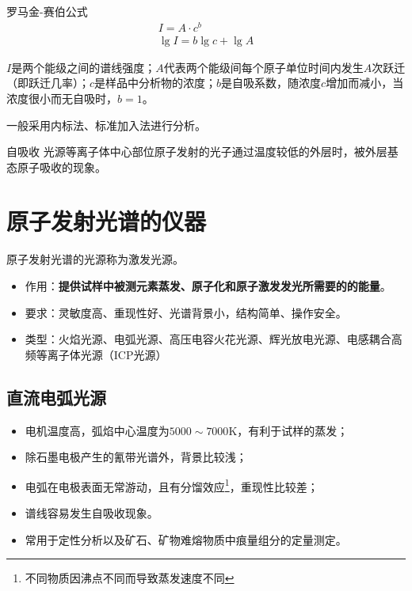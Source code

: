 \begin{theorem*}{罗马金-赛伯公式}{}
	\begin{gather*}
		I=A\cdot c^b\\
		\lg I = b \lg c + \lg A
	\end{gather*}
	
	$I$是两个能级之间的谱线强度；$A$代表两个能级间每个原子单位时间内发生$A$次跃迁（即跃迁几率）；$c$是样品中分析物的浓度；$b$是自吸系数，随浓度$c$增加而减小，当浓度很小而无自吸时，$b=1$。
\end{theorem*}


一般采用内标法、标准加入法进行分析。

\begin{definition*}{自吸收}{}
	光源等离子体中心部位原子发射的光子通过温度较低的外层时，被外层基态原子吸收的现象。
\end{definition*}

\section{原子发射光谱的仪器}

原子发射光谱的光源称为激发光源。
\begin{itemize}
	\item 作用：\textbf{提供试样中被测元素蒸发、原子化和原子激发发光所需要的的能量}。
	\item 要求：灵敏度高、重现性好、光谱背景小，结构简单、操作安全。
	\item 类型：火焰光源、电弧光源、高压电容火花光源、辉光放电光源、电感耦合高频等离子体光源（ICP光源）
\end{itemize}

\subsection{直流电弧光源}
\begin{itemize}
	\item 电机温度高，弧焰中心温度为$5000\sim 7000\mathrm{K}$，有利于试样的蒸发；
	\item 除石墨电极产生的氰带光谱外，背景比较浅；
	\item 电弧在电极表面无常游动，且有分馏效应\footnote{不同物质因沸点不同而导致蒸发速度不同}，重现性比较差；
	\item 谱线容易发生自吸收现象。
	\item 常用于定性分析以及矿石、矿物难熔物质中痕量组分的定量测定。
\end{itemize}

